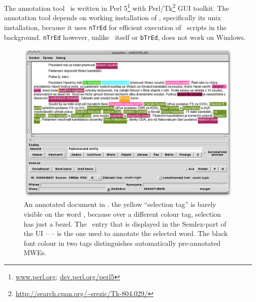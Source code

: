 
\chapter{\seman}
\label{sec:seman}
The annotation tool \seman\ is written in Perl 5\footnote{\url{www.perl.org}; \url{dev.perl.org/perl5}} with Perl/Tk\footnote{\url{http://search.cpan.org/~srezic/Tk-804.029/}} GUI toolkit. The annotation tool depends on working installation of \tred, specifically its unix installation, because it uses \texttt{nTrEd} for efficient execution of \tred\ scripts in the background. \texttt{nTrEd} however, unlike \tred\ itself or \texttt{bTrEd}, does not work on Windows.%

\begin{figure}[htbp]
   \centering
   \includegraphics[width=.9\textwidth]{images/sem-ann2.png} 
   \caption{An annotated document in \seman. the yellow ``selection tag'' is barely visible on the word , because over a  different colour tag, selection has just a bezel. The \semlex\ entry that is displayed in the Semlex-part of the UI --  -- is the one used to annotate the selected word. The black font colour in two tags distinguishes automatically pre-annotated MWEs.}
   \label{fig:seman-gui}
\end{figure}

